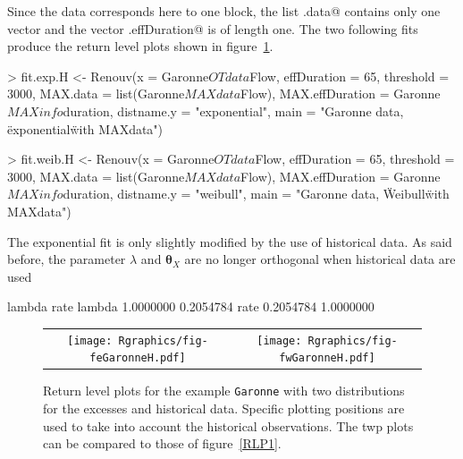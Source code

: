 \documentclass[a4paper]{report}
\newcommand{\bs}{\boldsymbol}
\begin{document}
Since the data corresponds here to one block, the list \verb@MAX.data@
contains only one vector and the vector \verb@MAX.effDuration@
is of length one. The two following fits produce the return level plots shown 
in figure~\ref{FIGHIST}.

\begin{Schunk}
\begin{Sinput}
> fit.exp.H <- Renouv(x = Garonne$OTdata$Flow,
                      effDuration = 65, threshold = 3000,
                      MAX.data = list(Garonne$MAXdata$Flow),
                      MAX.effDuration = Garonne$MAXinfo$duration,
                      distname.y = "exponential",
                      main = "Garonne data, \"exponential\" with MAXdata")
\end{Sinput}
\end{Schunk}

\begin{Schunk}
\begin{Sinput}
> fit.weib.H <- Renouv(x = Garonne$OTdata$Flow,
                       effDuration = 65, threshold = 3000,
                       MAX.data = list(Garonne$MAXdata$Flow),
                       MAX.effDuration = Garonne$MAXinfo$duration,
                       distname.y = "weibull",
                       main = "Garonne data, \"Weibull\" with MAXdata")
\end{Sinput}
\end{Schunk}

\noindent
The exponential fit is only slightly modified by the use of historical data. 
As said before, the parameter $\lambda$ and $\bs{\theta}_X$ are no longer
orthogonal when historical data are used

\begin{Schunk}
\begin{Soutput}
          lambda      rate
lambda 1.0000000 0.2054784
rate   0.2054784 1.0000000
\end{Soutput}
\end{Schunk}


\begin{figure}
   \centering
   \begin{tabular}{c c} 
     \texttt{[image: Rgraphics/fig-feGaronneH.pdf]} &
     \texttt{[image: Rgraphics/fig-fwGaronneH.pdf]} 
   \end{tabular}
   \caption{
     \label{FIGHIST}
     Return level plots for the example \texttt{Garonne} with two
     distributions for the excesses and historical data. Specific
     plotting positions are used to take into account the historical
     observations. The twp plots can be compared to those of
     figure~\ref{RLP1}.}
\end{figure}
\end{document}

